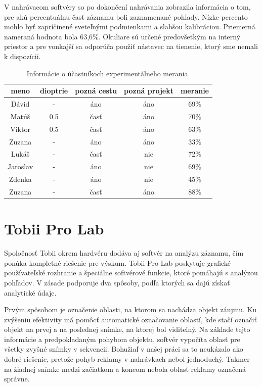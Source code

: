 V nahrávacom softvéry so po dokončení nahrávania zobrazila informácia o tom, pre akú percentuálnu časť záznamu boli zaznamenané pohľady. Nízke percento mohlo byť zapríčinené sveteľnými podmienkami a slabšou kalibráciou. Priemerná nameraná hodnota bola 63,6\%. Okuliare sú určené predovšetkým na interný priestor a pre vonkajší sa odporúča použiť nástavec na tienenie, ktorý sme nemali k dispozícii.
\\
\begin{table}[ht]
\centering
\begin{tabular}{ |c c c c c|  }
\hline
meno & dioptrie & pozná cestu & pozná projekt & meranie \\
\hline
Dávid & - & áno & áno & 69\% \\
Matúš & 0.5 & časť & áno & 70\% \\
Viktor & 0.5 & časť & áno & 63\% \\
Zuzana & - & áno & áno & 33\% \\
Lukáš & - & časť & nie & 72\% \\
Jaroslav & - & áno & nie & 69\% \\
Zdenka & - & áno & nie & 45\% \\
Zuzana & - & časť & áno & 88\% \\
\hline
\end{tabular}
\caption{Informácie o účastníkoch experimentálneho merania.}
\label{table:1}
\end{table}

\section{Tobii Pro Lab}

Spoločnosť Tobii okrem hardvéru dodáva aj softvér na analýzu záznamu, čím ponúka kompletné riešenie pre výskum. Tobii Pro Lab poskytuje grafické používateľské rozhranie a špeciálne softvérové funkcie, ktoré pomáhajú s analýzou pohľadov. V zásade podporuje dva spôsoby, podľa ktorých sa dajú získať analytické údaje. 

Prvým spôsobom je označenie oblasti, na ktorom sa nachádza objekt záujmu. Ku zvýšeniu efektivity má pomôcť automatické označovanie oblastí, kde stačí označiť objekt na prvej a na poslednej snímke, na ktorej bol viditeľný. Na základe tejto informácie a predpokladaným pohybom objektu, softvér vypočíta oblasť pre všetky zvyšné snímky v sekvencii. Bohužiaľ v našej práci sa to neukázalo ako dobré riešenie, pretože pohyb reklamy v nahrávkach nebol jednoduchý. Takmer na žiadnej snímke medzi začiatkom a koncom nebola oblasť reklamy označená správne. 

